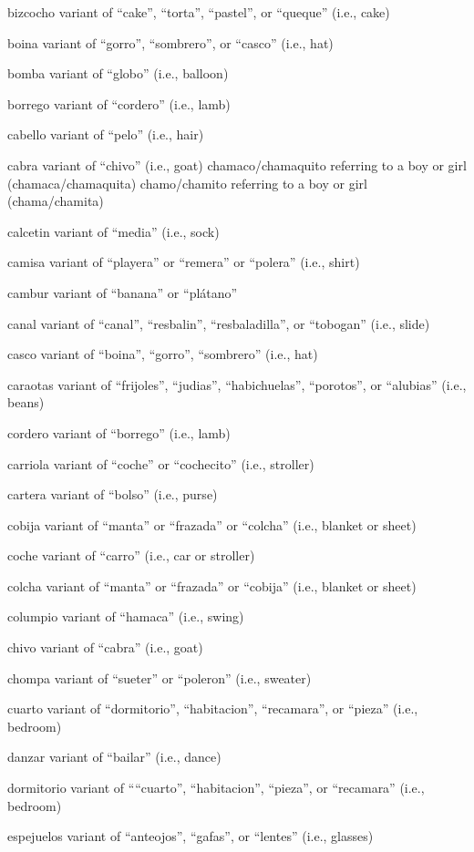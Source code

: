 \documentclass[
  12pt,
]{book}
\begin{document}
bizcocho
variant of ``cake'', ``torta'', ``pastel'', or ``queque'' (i.e., cake)

boina
variant of ``gorro'', ``sombrero'', or ``casco'' (i.e., hat)

bomba
variant of ``globo'' (i.e., balloon)

borrego
variant of ``cordero'' (i.e., lamb)

cabello
variant of ``pelo'' (i.e., hair)

cabra
variant of ``chivo'' (i.e., goat)
chamaco/chamaquito
referring to a boy or girl (chamaca/chamaquita)
chamo/chamito
referring to a boy or girl (chama/chamita)

calcetin
variant of ``media'' (i.e., sock)

camisa
variant of ``playera'' or ``remera'' or ``polera'' (i.e., shirt)

cambur
variant of ``banana'' or ``plátano''

canal
variant of ``canal'', ``resbalin'', ``resbaladilla'', or ``tobogan'' (i.e., slide)

casco
variant of ``boina'', ``gorro'', ``sombrero'' (i.e., hat)

caraotas
variant of ``frijoles'', ``judias'', ``habichuelas'', ``porotos'', or ``alubias'' (i.e., beans)

cordero
variant of ``borrego'' (i.e., lamb)

carriola
variant of ``coche'' or ``cochecito'' (i.e., stroller)

cartera
variant of ``bolso'' (i.e., purse)

cobija
variant of ``manta'' or ``frazada'' or ``colcha'' (i.e., blanket or sheet)

coche
variant of ``carro'' (i.e., car or stroller)

colcha
variant of ``manta'' or ``frazada'' or ``cobija'' (i.e., blanket or sheet)

columpio
variant of ``hamaca'' (i.e., swing)

chivo
variant of ``cabra'' (i.e., goat)

chompa
variant of ``sueter'' or ``poleron'' (i.e., sweater)

cuarto
variant of ``dormitorio'', ``habitacion'', ``recamara'', or ``pieza'' (i.e., bedroom)

danzar
variant of ``bailar'' (i.e., dance)

dormitorio
variant of ````cuarto'', ``habitacion'', ``pieza'', or ``recamara'' (i.e., bedroom)

espejuelos
variant of ``anteojos'', ``gafas'', or ``lentes'' (i.e., glasses)
\end{document}
